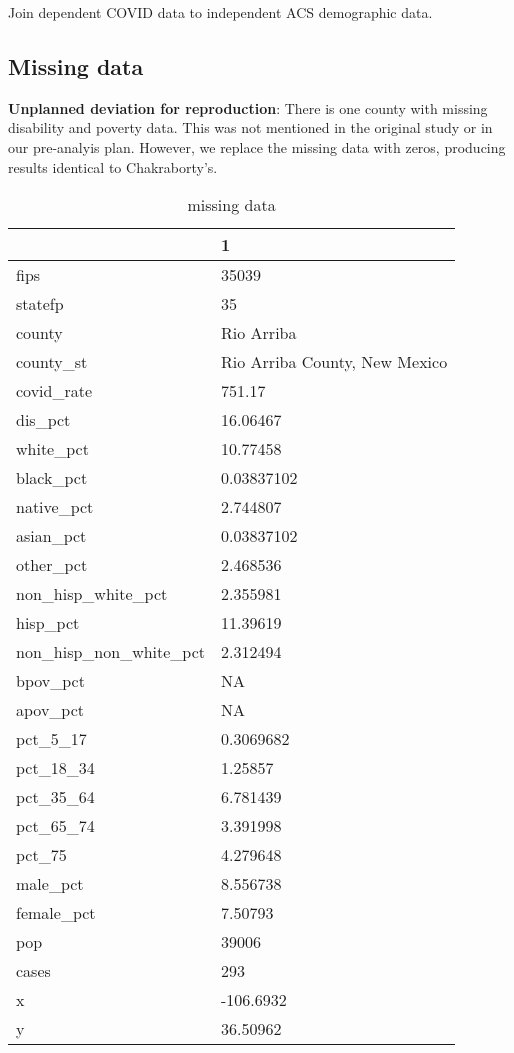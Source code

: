 \documentclass[
]{article}
\begin{document}
Join dependent COVID data to independent ACS demographic data.

\hypertarget{missing-data}{%
\subsection{Missing data}\label{missing-data}}

\textbf{Unplanned deviation for reproduction}: There is one county with
missing disability and poverty data. This was not mentioned in the
original study or in our pre-analyis plan. However, we replace the
missing data with zeros, producing results identical to Chakraborty's.

\begin{table}

\caption{\label{tab:missing data}missing data}
\centering
\begin{tabular}[t]{l|l}
\hline
  & 1\\
\hline
fips & 35039\\
\hline
statefp & 35\\
\hline
county & Rio Arriba\\
\hline
county\_st & Rio Arriba County, New Mexico\\
\hline
covid\_rate & 751.17\\
\hline
dis\_pct & 16.06467\\
\hline
white\_pct & 10.77458\\
\hline
black\_pct & 0.03837102\\
\hline
native\_pct & 2.744807\\
\hline
asian\_pct & 0.03837102\\
\hline
other\_pct & 2.468536\\
\hline
non\_hisp\_white\_pct & 2.355981\\
\hline
hisp\_pct & 11.39619\\
\hline
non\_hisp\_non\_white\_pct & 2.312494\\
\hline
bpov\_pct & NA\\
\hline
apov\_pct & NA\\
\hline
pct\_5\_17 & 0.3069682\\
\hline
pct\_18\_34 & 1.25857\\
\hline
pct\_35\_64 & 6.781439\\
\hline
pct\_65\_74 & 3.391998\\
\hline
pct\_75 & 4.279648\\
\hline
male\_pct & 8.556738\\
\hline
female\_pct & 7.50793\\
\hline
pop & 39006\\
\hline
cases & 293\\
\hline
x & -106.6932\\
\hline
y & 36.50962\\
\hline
\end{tabular}
\end{table}
\end{document}
